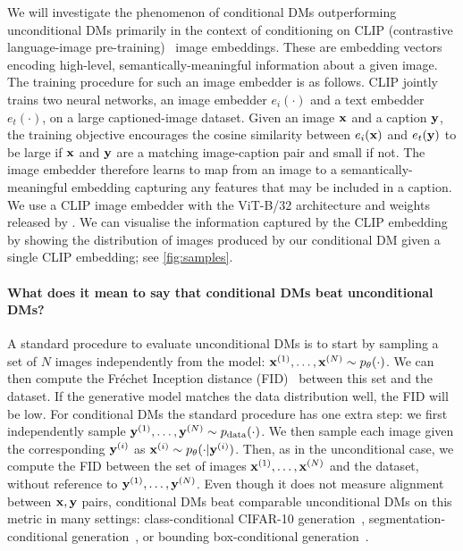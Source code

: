 We will investigate the phenomenon of conditional DMs outperforming unconditional DMs primarily in the context of conditioning on CLIP (contrastive language-image pre-training)~\citep{radford2021learning} image embeddings. These are embedding vectors encoding high-level, semantically-meaningful information about a given image. The training procedure for such an image embedder is as follows. CLIP jointly trains two neural networks, an image embedder $e_i(\cdot)$ and a text embedder $e_t(\cdot)$, on a large captioned-image dataset. Given an image ${\mathbf{x}}$ and a caption ${\mathbf{y}}$, the training objective encourages the cosine similarity between $e_i({\mathbf{x}})$ and $e_t({\mathbf{y}})$ to be large if ${\mathbf{x}}$ and ${\mathbf{y}}$ are a matching image-caption pair and small if not.
The image embedder therefore learns to map from an image to a semantically-meaningful embedding capturing any features that may be included in a caption. We use a CLIP image embedder with the ViT-B/32 architecture and weights released by \citet{radford2021learning}. We can visualise the information captured by the CLIP embedding by showing the distribution of images produced by our conditional DM given a single CLIP embedding; see \cref{fig:samples}.

\paragraph{What does it mean to say that conditional DMs beat unconditional DMs?} A standard procedure to evaluate unconditional DMs is to start by sampling a set of $N$ images independently from the model: ${{\mathbf{x}}^{(1)},\ldots,{\mathbf{x}}^{(N)} \sim p_\theta(\cdot)}$. We can then compute the Fr\'echet Inception distance (FID)~\citep{heusel2017gans} between this set and the dataset. If the generative model matches the data distribution well, the FID will be low.
%
For conditional DMs the standard procedure has one extra step: we first independently sample ${{\mathbf{y}}^{(1)},\ldots,{\mathbf{y}}^{(N)} \sim p_{\rm{data}}(\cdot)}$. We then sample each image given the corresponding ${\mathbf{y}}^{(i)}$ as ${{\mathbf{x}}^{(i)} \sim p_\theta(\cdot|{\mathbf{y}}^{(i)})}$. 
%
Then, as in the unconditional case, we compute the FID between the set of images ${\mathbf{x}}^{(1)},\ldots,{\mathbf{x}}^{(N)}$ and the dataset, without reference to ${\mathbf{y}}^{(1)},\ldots,{\mathbf{y}}^{(N)}$. Even though it does not measure alignment between ${\mathbf{x}}, {\mathbf{y}}$ pairs, conditional DMs beat comparable unconditional DMs on this metric in many settings: class-conditional CIFAR-10 generation~\citep{karras2022elucidating}, segmentation-conditional generation~\citep{hu2022self}, or bounding box-conditional generation~\citep{hu2022self}.

